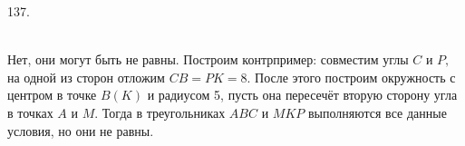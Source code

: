 137. \begin{figure}[ht!]
\end{figure}\\
Нет, они могут быть не равны. Построим контрпример: совместим углы $C$ и $P,$ на одной из сторон отложим $CB=PK=8.$ После этого построим окружность с центром в точке $B(K)$ и радиусом 5, пусть она пересечёт вторую сторону угла в точках $A$ и $M.$ Тогда в треугольниках $ABC$ и $MKP$ выполняются все данные условия, но они не равны.\\

